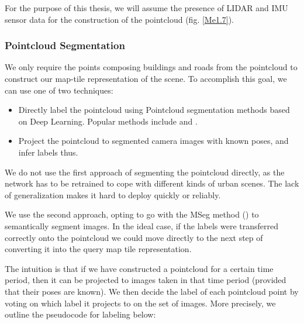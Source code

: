 For the purpose of this thesis, we will assume the presence of LIDAR and IMU sensor data for the construction of the pointcloud (fig. \ref{Me1.7}). 

\subsubsection{Pointcloud Segmentation}

We only require the points composing buildings and roads from the pointcloud to construct our map-tile representation of the scene. To accomplish this goal, we can use one of two techniques: 

\begin{itemize}
	\item Directly label the pointcloud using Pointcloud segmentation methods based on Deep Learning. Popular methods include \cite{qi2016} and \cite{alnaggar2020}.\\
	
	\item Project the pointcloud to segmented camera images with known poses, and infer labels thus. 
\end{itemize}

We do not use the first approach of segmenting the pointcloud directly, as the network has to be retrained to cope with different kinds of urban scenes. The lack of generalization makes it hard to deploy quickly or reliably. 

We use the second approach, opting to go with the MSeg method (\cite{mseg2020}) to semantically segment images. In the ideal case, if the labels were transferred correctly onto the pointcloud we could move directly to the next step of converting it into the query map tile representation.

The intuition is that if we have constructed a pointcloud for a certain time period, then it can be projected to images taken in that time period (provided that their poses are known). We then decide the label of each pointcloud point by voting on which label it projects to on the set of images. More precisely, we outline the pseudocode for labeling below:

